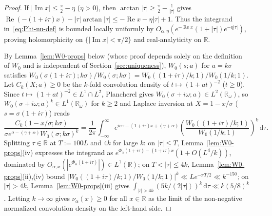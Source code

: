 \documentclass[11pt, reqno]{amsart}
\theoremstyle{remark}
\numberwithin{equation}{section}
\DeclareMathOperator{\re}{Re}
\DeclareMathOperator{\im}{Im}
\newcommand{\R}{\mathbb{R}}
\newcommand{\dd}{\,\mathrm{d}}
\begin{document}
\begin{proof}
If $|\im x| \le \frac{\pi}{2} - \eta$ ($\eta > 0$), then $\arctan|\tau| \ge \frac{\pi}{2} - \frac{1}{|\tau|}$
gives $\re(-(1+i\tau)x) - |\tau|\arctan|\tau| \le -\re x - \eta|\tau| + 1$. Thus the integrand
in~\eqref{eq:Phi-nu-def} is bounded locally uniformly by $O_{\alpha,\eta}(e^{-\re x}(1+|\tau|)e^{-\eta|\tau|})$,
proving holomorphicity on $\{|\im x| < \pi/2\}$ and real-analyticity on $\R$.

By Lemma~\ref{lem:W0-props} below (whose proof depends solely on the definition of $W_0$ and
is independent of Section~\ref{sec:uniqueness}), $W_0(s; a)$ for $a = k\sigma$ satisfies
$W_0(\sigma(1+i\tau); k\sigma)/W_0(\sigma; k\sigma) = W_0((1+i\tau)/k; 1)/W_0(1/k; 1)$.
Let $C_k(X; a) \ge 0$ be the $k$-fold convolution density of $t \mapsto (1+at)^{-2}$ ($t \ge 0$).
Since $t \mapsto (1+at)^{-2} \in L^1 \cap L^2$, Plancherel gives $W_0(\sigma+i\omega; a) \in L^2(\R_\omega)$,
so $W_0(\sigma+i\omega; a)^k \in L^1(\R_\omega)$ for $k \ge 2$ and Laplace inversion at
$X = 1 - x/\sigma$ ($s = \sigma(1+i\tau)$) reads
\[
\frac{C_k(1 - x/\sigma; k\sigma)}{\sigma e^{\sigma - (\gamma+\alpha)} W_0(\sigma; k\sigma)^k}
= \frac{1}{2\pi}\int_{-\infty}^\infty e^{i\sigma\tau - (1+i\tau)x + (\gamma+\alpha)}
\left(\frac{W_0((1+i\tau)/k; 1)}{W_0(1/k; 1)}\right)^{\!k}\dd\tau.
\]
Splitting $\tau \in \R$ at $T := 100 L$ and $4k$ for large $k$: on $|\tau| \le T$,
Lemma~\ref{lem:W0-props}(iv) expresses the integrand as
$e^{\Phi_\alpha(1+i\tau)-(1+i\tau)x}(1 + O(L^4/k))$, dominated by
$O_{\alpha,x}(|e^{\Phi_\alpha(1+i\tau)}|) \in L^1(\R)$; on $T < |\tau| \le 4k$,
Lemma~\ref{lem:W0-props}(ii),(iv) bound $|W_0((1+i\tau)/k; 1)/W_0(1/k; 1)|^k \ll L e^{-\pi T/2} \ll k^{-150}$;
on $|\tau| > 4k$, Lemma~\ref{lem:W0-props}(iii) gives $\int_{|\tau|>4k} (5k/(2|\tau|))^k \dd\tau \ll k(5/8)^k$.
Letting $k \to \infty$ gives $\nu_\alpha(x) \ge 0$ for all $x \in \R$ as the limit of the
non-negative normalized convolution density on the left-hand side.


\end{proof}
\end{document}
